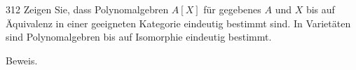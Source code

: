 \begin{algebraUE}{312}
Zeigen Sie, dass Polynomalgebren $A[X]$ für gegebenes $A$ und $X$ bis auf Äquivalenz
in einer geeigneten Kategorie eindeutig bestimmt sind. In Varietäten sind
Polynomalgebren bis auf Isomorphie eindeutig bestimmt.
\end{algebraUE}
\begin{solution}
Beweis.
\end{solution}
